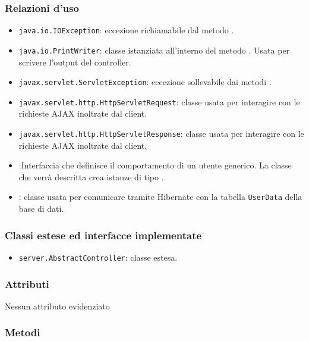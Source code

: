 \subsubsection*{Relazioni d'uso}

\begin{itemize}
	\item \texttt{java.io.IOException}: eccezione richiamabile dal metodo .
	\item \texttt{java.io.PrintWriter}: classe istanziata all'interno del metodo . Usata per scrivere l'output del controller.
	\item \texttt{javax.servlet.ServletException}: eccezione sollevabile dai metodi .
	\item \texttt{javax.servlet.http.HttpServletRequest}: classe usata per interagire con le richieste AJAX inoltrate dal client.
	\item \texttt{javax.servlet.http.HttpServletResponse}: classe usata per interagire con le richieste AJAX inoltrate dal client.
	\item {}:Interfaccia che definisce il comportamento di un utente generico. La classe che verrà descritta crea istanze di tipo .
	\item {}: classe usata per comunicare tramite Hibernate con la tabella \texttt{UserData} della base di dati.
\end{itemize}

\subsubsection*{Classi estese ed interfacce implementate}
\begin{itemize}
	\item \texttt{server.AbstractController}: classe estesa.
\end{itemize}

\subsubsection*{Attributi}

Nessun attributo evidenziato

\subsubsection*{Metodi}

